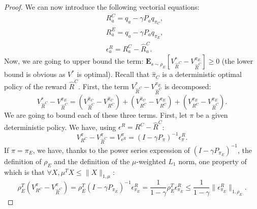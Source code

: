 \documentclass[smallextended]{svjour3}
\newcommand{\E}{\mathbf{E}}
\begin{document}
\begin{proof}
We can now introduce the following vectorial equations:
\begin{align}
&R^C_a=q_a-\gamma P_aq_{\pi_C},
\\
&R^E_a=q_a-\gamma P_aq_{\pi_E},
\\
&\epsilon^R_a=R^C_a-\hat{R}^C_a.
\end{align}
Now, we are going to upper bound the term: $\E_{s\sim\rho_E}[V^*_{\hat{R}^C}-V^{\pi_E}_{\hat{R}^C}]\geq0$ (the lower bound is obvious as $V^*$ is optimal).
Recall that $\hat{\pi}_C$ is a deterministic optimal policy of the reward $\hat{R}^C$. First, the term $V^*_{\hat{R}^C}-V^{\pi_E}_{\hat{R}^C}$ is decomposed:
\begin{equation}
V^*_{\hat{R}^C}-V^{\pi_E}_{\hat{R}^C}=(V^{\hat{\pi}_C}_{\hat{R}^C}-V^{\hat{\pi}_C}_{R^C})+(V^{\hat{\pi}_C}_{R^C}-V^{\pi_E}_{R^C})+(V^{\pi_E}_{R^C}-V^{\pi_E}_{\hat{R}^C}).
\end{equation}
We are going to bound each of these three terms. First, let $\pi$ be a given deterministic policy. We have, using $\epsilon^R = R^C - \hat R^C$:
\begin{equation}
V^{\pi}_{R^C}-V^{\pi}_{\hat{R}^C}=V^{\pi}_{\epsilon^R}=(I-\gamma P_\pi)^{-1}\epsilon^R_{\pi}.
\end{equation}
If $\pi=\pi_E$, we have, thanks to the power series expression of $(I-\gamma P_{\pi_E})^{-1}$, the definition of $\rho_E$ and the definition of the $\mu$-weighted $L_1$ norm, one property of which is that $\forall X, \mu^TX \leq \|X\|_{1,\mu}$:
\begin{equation}
  \rho_E^T(V^{\pi}_{R^C}-V^{\pi}_{\hat{R}^C})=\rho_E^T(I-\gamma P_{\pi_E})^{-1}\epsilon^R_{\pi_E}=\frac{1}{1-\gamma}\rho_E^T\epsilon^R_{\pi_E}\leq\frac{1}{1-\gamma}\|\epsilon^R_{\pi_E}\|_{1,\rho_E}.\end{equation}


\end{proof}
\end{document}
